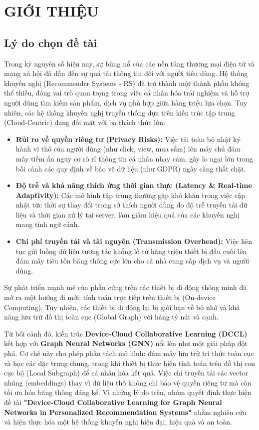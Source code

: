 \chapter{GIỚI THIỆU}

\section{Lý do chọn đề tài}

Trong kỷ nguyên số hiện nay, sự bùng nổ của các nền tảng thương mại điện tử và mạng xã hội đã dẫn đến sự quá tải thông tin đối với người tiêu dùng. Hệ thống khuyến nghị (Recommender Systems - RS) đã trở thành một thành phần không thể thiếu, đóng vai trò quan trọng trong việc cá nhân hóa trải nghiệm và hỗ trợ người dùng tìm kiếm sản phẩm, dịch vụ phù hợp giữa hàng triệu lựa chọn. Tuy nhiên, các hệ thống khuyến nghị truyền thống dựa trên kiến trúc tập trung (Cloud-Centric) đang đối mặt với ba thách thức lớn:

\begin{itemize}
    \item \textbf{Rủi ro về quyền riêng tư (Privacy Risks):} Việc tải toàn bộ nhật ký hành vi thô của người dùng (như click, view, mua sắm) lên máy chủ đám mây tiềm ẩn nguy cơ rò rỉ thông tin cá nhân nhạy cảm, gây lo ngại lớn trong bối cảnh các quy định về bảo vệ dữ liệu (như GDPR) ngày càng thắt chặt.
    \item \textbf{Độ trễ và khả năng thích ứng thời gian thực (Latency \& Real-time Adaptivity):} Các mô hình tập trung thường gặp khó khăn trong việc cập nhật tức thời sự thay đổi trong sở thích người dùng do độ trễ truyền tải dữ liệu và thời gian xử lý tại server, làm giảm hiệu quả của các khuyến nghị mang tính ngữ cảnh.
    \item \textbf{Chi phí truyền tải và tài nguyên (Transmission Overhead):} Việc liên tục gửi luồng dữ liệu tương tác khổng lồ từ hàng triệu thiết bị đầu cuối lên đám mây tiêu tốn băng thông cực lớn cho cả nhà cung cấp dịch vụ và người dùng.
\end{itemize}

Sự phát triển mạnh mẽ của phần cứng trên các thiết bị di động thông minh đã mở ra một hướng đi mới: tính toán trực tiếp trên thiết bị (On-device Computing). Tuy nhiên, các thiết bị di động lại bị giới hạn về bộ nhớ và khả năng lưu trữ đồ thị toàn cục (Global Graph) với hàng tỷ nút và cạnh.

Từ bối cảnh đó, kiến trúc \textbf{Device-Cloud Collaborative Learning (DCCL)} kết hợp với \textbf{Graph Neural Networks (GNN)} nổi lên như một giải pháp đột phá. Cơ chế này cho phép phân tách mô hình: đám mây lưu trữ tri thức toàn cục và học các đặc trưng chung, trong khi thiết bị thực hiện tính toán trên đồ thị con cục bộ (Local Subgraph) để cá nhân hóa kết quả. Việc chỉ truyền tải các vector nhúng (embeddings) thay vì dữ liệu thô không chỉ bảo vệ quyền riêng tư mà còn tối ưu hóa băng thông đáng kể. Vì những lý do trên, nhóm quyết định thực hiện đề tài \textbf{"Device-Cloud Collaborative Learning for Graph Neural Networks in Personalized Recommendation Systems"} nhằm nghiên cứu và hiện thực hóa một hệ thống khuyến nghị hiện đại, hiệu quả và an toàn.


